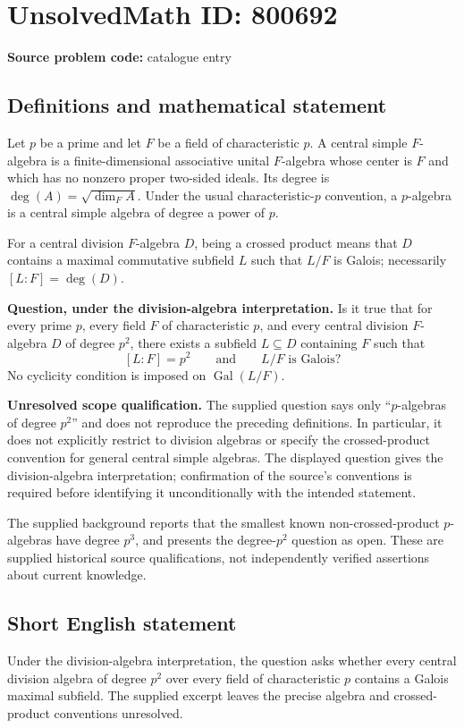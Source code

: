 \documentclass[11pt]{article}
\begin{document}
\section*{UnsolvedMath ID: 800692}
\textbf{Source problem code:} catalogue entry
\subsection{Definitions and mathematical statement}
Let \(p\) be a prime and let \(F\) be a field of characteristic \(p\). A central simple \(F\)-algebra is a finite-dimensional associative unital \(F\)-algebra whose center is \(F\) and which has no nonzero proper two-sided ideals. Its degree is \(\deg(A)=\sqrt{\dim_F A}\). Under the usual characteristic-\(p\) convention, a \(p\)-algebra is a central simple algebra of degree a power of \(p\).

For a central division \(F\)-algebra \(D\), being a crossed product means that \(D\) contains a maximal commutative subfield \(L\) such that \(L/F\) is Galois; necessarily \([L:F]=\deg(D)\).

\textbf{Question, under the division-algebra interpretation.} Is it true that for every prime \(p\), every field \(F\) of characteristic \(p\), and every central division \(F\)-algebra \(D\) of degree \(p^2\), there exists a subfield \(L\subseteq D\) containing \(F\) such that
\[
[L:F]=p^2\qquad\text{and}\qquad L/F\text{ is Galois}?
\]
No cyclicity condition is imposed on \(\operatorname{Gal}(L/F)\).

\textbf{Unresolved scope qualification.} The supplied question says only ``\(p\)-algebras of degree \(p^2\)'' and does not reproduce the preceding definitions. In particular, it does not explicitly restrict to division algebras or specify the crossed-product convention for general central simple algebras. The displayed question gives the division-algebra interpretation; confirmation of the source's conventions is required before identifying it unconditionally with the intended statement.

The supplied background reports that the smallest known non-crossed-product \(p\)-algebras have degree \(p^3\), and presents the degree-\(p^2\) question as open. These are supplied historical source qualifications, not independently verified assertions about current knowledge.
\subsection{Short English statement}
Under the division-algebra interpretation, the question asks whether every central division algebra of degree \(p^2\) over every field of characteristic \(p\) contains a Galois maximal subfield. The supplied excerpt leaves the precise algebra and crossed-product conventions unresolved.
\end{document}
